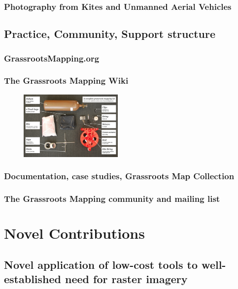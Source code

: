 \documentclass[11pt]{report}
\begin{document}
\subsubsection{Photography from Kites and Unmanned Aerial Vehicles}
\subsection{Practice, Community, Support structure}
\subsubsection{GrassrootsMapping.org}
\subsubsection*{The Grassroots Mapping Wiki}
\begin{figure}
	\begin{flushright}
		\includegraphics[width=0.45\textwidth]{images/100-dollar-satellite-poster.jpg}
	\end{flushright}
\end{figure}
\subsubsection*{Documentation, case studies, Grassroots Map Collection}
\subsubsection*{The Grassroots Mapping community and mailing list}
\section{Novel Contributions}
\subsection{Novel application of low-cost tools to well-established need for raster imagery}
\end{document}
